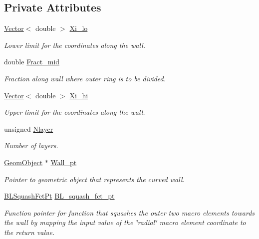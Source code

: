 \subsection*{Private Attributes}
\begin{DoxyCompactItemize}
\item 
\hyperlink{classoomph_1_1Vector}{Vector}$<$ double $>$ \hyperlink{classoomph_1_1QuarterTubeDomain_a63fb621521e3e01a84ae393f73fc7117}{Xi\+\_\+lo}
\begin{DoxyCompactList}\small\item\em Lower limit for the coordinates along the wall. \end{DoxyCompactList}\item 
double \hyperlink{classoomph_1_1QuarterTubeDomain_aed92f9d08bf052a1575d4de159adfb7a}{Fract\+\_\+mid}
\begin{DoxyCompactList}\small\item\em Fraction along wall where outer ring is to be divided. \end{DoxyCompactList}\item 
\hyperlink{classoomph_1_1Vector}{Vector}$<$ double $>$ \hyperlink{classoomph_1_1QuarterTubeDomain_ab28aec59a8756da42f74c0affb7276c2}{Xi\+\_\+hi}
\begin{DoxyCompactList}\small\item\em Upper limit for the coordinates along the wall. \end{DoxyCompactList}\item 
unsigned \hyperlink{classoomph_1_1QuarterTubeDomain_a64d806aba766a439eb6ea49798c50b13}{Nlayer}
\begin{DoxyCompactList}\small\item\em Number of layers. \end{DoxyCompactList}\item 
\hyperlink{classoomph_1_1GeomObject}{Geom\+Object} $\ast$ \hyperlink{classoomph_1_1QuarterTubeDomain_af394493bc3c3b0f06d9f591e1d02c0f9}{Wall\+\_\+pt}
\begin{DoxyCompactList}\small\item\em Pointer to geometric object that represents the curved wall. \end{DoxyCompactList}\item 
\hyperlink{classoomph_1_1QuarterTubeDomain_a3d8c15c17d9912d8c519c028437c0b2c}{B\+L\+Squash\+Fct\+Pt} \hyperlink{classoomph_1_1QuarterTubeDomain_a2c55367b6f92fa1928326b8e0c62115b}{B\+L\+\_\+squash\+\_\+fct\+\_\+pt}
\begin{DoxyCompactList}\small\item\em Function pointer for function that squashes the outer two macro elements towards the wall by mapping the input value of the \char`\"{}radial\char`\"{} macro element coordinate to the return value. \end{DoxyCompactList}\item 

\end{DoxyCompactItemize}
